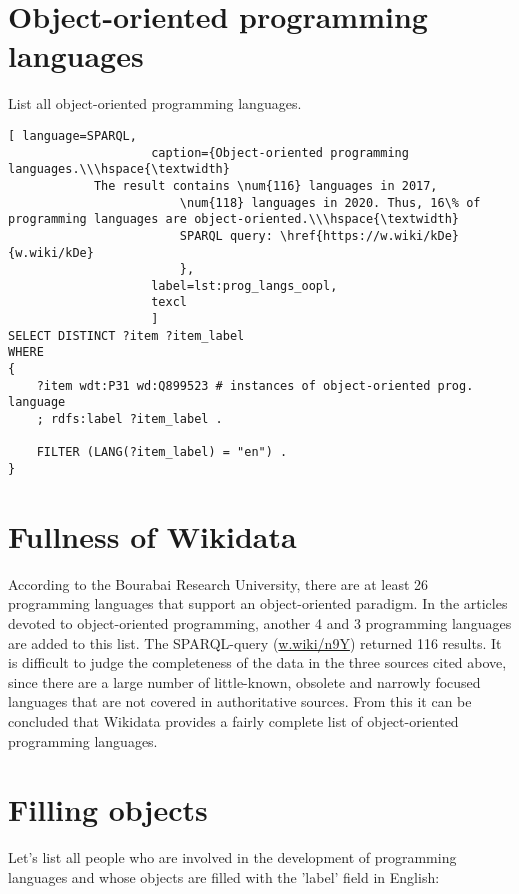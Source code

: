 \section{Object-oriented programming languages}

List all object-oriented programming languages.

\begin{lstlisting}[ language=SPARQL, 
                    caption={Object-oriented programming languages.\\\hspace{\textwidth}
			The result contains \num{116} languages in 2017, 
                        \num{118} languages in 2020. Thus, 16\% of programming languages are object-oriented.\\\hspace{\textwidth}
                        SPARQL query: \href{https://w.wiki/kDe}{w.wiki/kDe}
                        },
                    label=lst:prog_langs_oopl,
                    texcl 
                    ]
SELECT DISTINCT ?item ?item_label
WHERE
{
    ?item wdt:P31 wd:Q899523 # instances of object-oriented prog. language
    ; rdfs:label ?item_label . 

    FILTER (LANG(?item_label) = "en") . 
}
\end{lstlisting}%

\section{Fullness of Wikidata}

According to the Bourabai Research University, there are at least 26 programming languages that support an object-oriented paradigm. In the articles devoted to object-oriented programming, another 4 and 3 programming languages are added to this list. The SPARQL-query (\href{https://w.wiki/n9Y}{w.wiki/n9Y}) returned 116 results. It is difficult to judge the completeness of the data in the three sources cited above, since there are a large number of little-known, obsolete and narrowly focused languages that are not covered in authoritative sources. From this it can be concluded that Wikidata provides a fairly complete list of object-oriented programming languages.

\section{Filling objects}

Let's list all people who are involved in the development of programming languages and whose objects are filled with the 'label' field in English:


